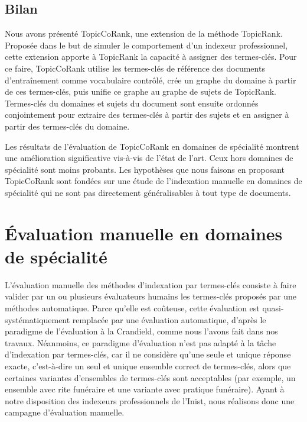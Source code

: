     \subsection{Bilan}
    \label{subsec:main-domain_specific_keyphrase_annotation-supervised_automatic_keyphrase_annotation-conclusion}
      Nous avons présenté TopicCoRank, une extension de la méthode TopicRank.
      Proposée dans le but de simuler le comportement d'un indexeur
      professionnel, cette extension apporte à TopicRank la capacité à assigner
      des termes-clés. Pour ce faire, TopicCoRank utilise les termes-clés de
      référence des documents d'entraînement comme vocabulaire contrôlé, crée un
      graphe du domaine à partir de ces termes-clés, puis unifie ce
      graphe au graphe de sujets de TopicRank. Termes-clés du domaines et sujets
      du document sont ensuite ordonnés conjointement pour extraire des
      termes-clés à partir des sujets et en assigner à partir des termes-clés du
      domaine.

      Les résultats de l'évaluation de TopicCoRank en domaines de spécialité
      montrent une amélioration significative vis-à-vis de l'état de l'art. Ceux
      hors domaines de spécialité sont moins probants. Les hypothèses que nous
      faisons en proposant TopicCoRank sont fondées sur une étude de
      l'indexation manuelle en domaines de spécialité qui ne sont pas
      directement généralisables à tout type de documents.


  \section{Évaluation manuelle en domaines de spécialité}
  \label{sec:main-domain_specific_keyphrase_annotation-manual_evaluation}
    L'évaluation manuelle des méthodes d'indexation par termes-clés consiste à
    faire valider par un ou plusieurs évaluateurs humains les termes-clés
    proposés par une méthodes automatique. Parce qu'elle est coûteuse, cette
    évaluation est quasi-systématiquement remplacée par une évaluation
    automatique, d'après le paradigme de l'évaluation \og{}à la Crandield\fg{},
    comme nous l'avons fait dans nos travaux. Néanmoins, ce paradigme
    d'évaluation n'est pas adapté à la tâche d'indexation par termes-clés, car
    il ne considère qu'une seule et unique réponse exacte, c'est-à-dire un seul
    et unique ensemble correct de termes-clés, alors que certaines variantes
    d'ensembles de termes-clés sont acceptables (par exemple, un ensemble avec
    \og{}rite funéraire\fg{} et une variante avec \og{}pratique funéraire\fg{}).
    Ayant à notre disposition des indexeurs professionnels de l'Inist, nous
    réalisons donc une campagne d'évaluation manuelle.

